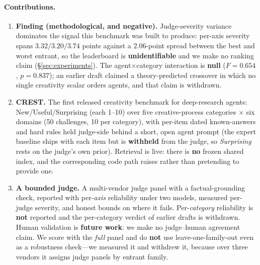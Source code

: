 \paragraph{Contributions.}
\begin{enumerate}
  \item \textbf{Finding (methodological, and negative).} Judge-severity variance dominates the signal this benchmark was built to produce: per-axis severity spans $3.32/3.20/3.74$ points against a $2.06$-point spread between the best and worst entrant, so the leaderboard is \textbf{unidentifiable} and we make no ranking claim (\S\ref{sec:experiments}). The agent$\times$category interaction is \textbf{null} ($F=0.654$, $p=0.837$); an earlier draft claimed a theory-predicted crossover in which no single creativity scalar orders agents, and that claim is withdrawn.
  \item \textbf{CREST.} The first released creativity benchmark for deep-research agents: New/Useful/Surprising (each 1--10) over five creative-process categories $\times$ six domains (50 challenges, 10 per category), with per-item dated known-answers and hard rules held judge-side behind a short, open agent prompt (the expert baseline ships with each item but is \textbf{withheld} from the judge, so \emph{Surprising} rests on the judge's own prior). Retrieval is live: there is \textbf{no} frozen shared index, and the corresponding code path raises rather than pretending to provide one.
  \item \textbf{A bounded judge.} A multi-vendor judge panel with a factual-grounding check, reported with per-\emph{axis} reliability under two models, measured per-judge severity, and honest bounds on where it fails. Per-\emph{category} reliability is \textbf{not} reported and the per-category verdict of earlier drafts is withdrawn. Human validation is \textbf{future work}: we make no judge--human agreement claim. We score with the \emph{full} panel and do \textbf{not} use leave-one-family-out even as a robustness check---we measured it and withdrew it, because over three vendors it assigns judge panels by entrant family.
\end{enumerate}
